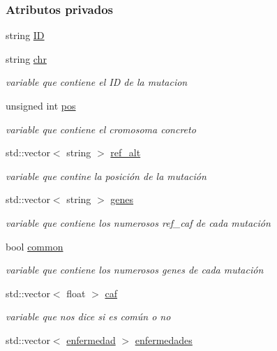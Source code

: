 \subsubsection*{Atributos privados}
\begin{DoxyCompactItemize}
\item 
string \hyperlink{classmutacion_aafc39218473e0f21eb0c3dc05dd4f35e}{ID}
\item 
string \hyperlink{classmutacion_a57651966b952f782240ff9cff72c5d2f}{chr}
\begin{DoxyCompactList}\small\item\em variable que contiene el ID de la mutacion \end{DoxyCompactList}\item 
unsigned int \hyperlink{classmutacion_ae1487b8648d0eaad68de5e4e5a87f3ff}{pos}
\begin{DoxyCompactList}\small\item\em variable que contiene el cromosoma concreto \end{DoxyCompactList}\item 
std\+::vector$<$ string $>$ \hyperlink{classmutacion_a2b3d0ed7547618562fae965d373b39e3}{ref\+\_\+alt}
\begin{DoxyCompactList}\small\item\em variable que contine la posición de la mutación \end{DoxyCompactList}\item 
std\+::vector$<$ string $>$ \hyperlink{classmutacion_af0048945b6062d6eb88b91db707993f6}{genes}
\begin{DoxyCompactList}\small\item\em variable que contiene los numerosos ref\+\_\+caf de cada mutación \end{DoxyCompactList}\item 
bool \hyperlink{classmutacion_a6dabfef6167d64030f095887b15f65dd}{common}
\begin{DoxyCompactList}\small\item\em variable que contiene los numerosos genes de cada mutación \end{DoxyCompactList}\item 
std\+::vector$<$ float $>$ \hyperlink{classmutacion_aef3fe46b6a2d10e3993703ebd5d5be5f}{caf}
\begin{DoxyCompactList}\small\item\em variable que nos dice si es común o no \end{DoxyCompactList}\item 
std\+::vector$<$ \hyperlink{classenfermedad}{enfermedad} $>$ \hyperlink{classmutacion_ac8cca92dea1ab6fb9c193eed55a5ad28}{enfermedades}

\end{DoxyCompactItemize}
